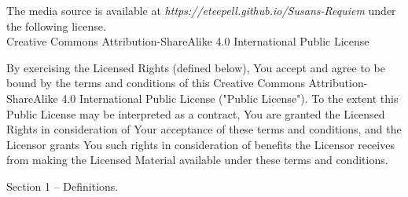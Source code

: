 The media source is available at \textit{https://eteepell.github.io/Susans-Requiem} under the following license.\\

Creative Commons Attribution-ShareAlike 4.0 International Public License

By exercising the Licensed Rights (defined below), You accept and agree to be bound by the terms and conditions of this Creative Commons Attribution-ShareAlike 4.0 International Public License ("Public License"). To the extent this Public License may be interpreted as a contract, You are granted the Licensed Rights in consideration of Your acceptance of these terms and conditions, and the Licensor grants You such rights in consideration of benefits the Licensor receives from making the Licensed Material available under these terms and conditions.

Section 1 – Definitions.


